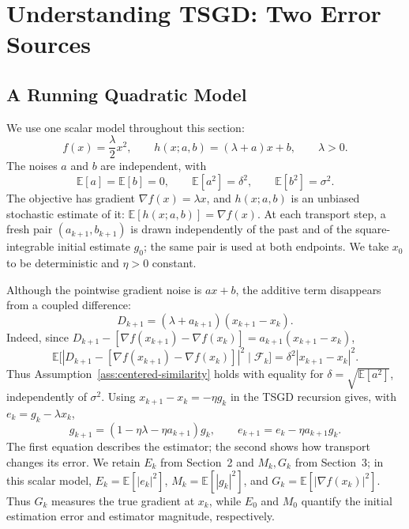 \section{Understanding TSGD: Two Error Sources}
\label{sec:two-error-sources}

\subsection{A Running Quadratic Model}
\label{subsec:quadratic-model}

We use one scalar model throughout this section:
\begin{equation}
\label{eq:quadratic-noise-model}
f(x)=\frac{\lambda}{2}x^2,\qquad
h(x;a,b)=(\lambda+a)x+b,
\qquad \lambda>0.
\end{equation}
The noises $a$ and $b$ are independent, with
\[
\mathbb{E}[a]=\mathbb{E}[b]=0,\qquad
\mathbb{E}[a^2]=\delta^2,\qquad
\mathbb{E}[b^2]=\sigma^2.
\]
The objective has gradient $\nabla f(x)=\lambda x$, and
$h(x;a,b)$ is an unbiased stochastic estimate of it:
$\mathbb{E}[h(x;a,b)]=\nabla f(x)$.
At each transport step, a fresh pair $(a_{k+1},b_{k+1})$ is drawn
independently of the past and of the square-integrable initial estimate
$g_0$; the same pair is used at both endpoints. We take $x_0$ to be
deterministic and $\eta>0$ constant.

Although the pointwise gradient noise is $ax+b$, the additive term
disappears from a coupled difference:
\begin{equation}
\label{eq:quadratic-coupled-difference}
D_{k+1}=(\lambda+a_{k+1})(x_{k+1}-x_k).
\end{equation}
Indeed, since
$D_{k+1}-[\nabla f(x_{k+1})-\nabla f(x_k)]
=a_{k+1}(x_{k+1}-x_k)$,
\[
\mathbb{E}\bigl[|D_{k+1}-[\nabla f(x_{k+1})-
\nabla f(x_k)]|^2\mid\mathcal F_k\bigr]
=\delta^2|x_{k+1}-x_k|^2.
\]
Thus Assumption~\ref{ass:centered-similarity} holds with equality
for $\delta=\sqrt{\mathbb{E}[a^2]}$, independently of $\sigma^2$.
Using $x_{k+1}-x_k=-\eta g_k$ in the TSGD recursion gives,
with $e_k=g_k-\lambda x_k$,
\begin{equation}
\label{eq:quadratic-core-recursions}
g_{k+1}=(1-\eta\lambda-\eta a_{k+1})g_k,
\qquad
e_{k+1}=e_k-\eta a_{k+1}g_k.
\end{equation}
The first equation describes the estimator; the second shows how
transport changes its error. We retain $E_k$ from Section~2 and
$M_k,G_k$ from Section~3; in this scalar model,
$E_k=\mathbb{E}[|e_k|^2]$, $M_k=\mathbb{E}[|g_k|^2]$, and
$G_k=\mathbb{E}[|\nabla f(x_k)|^2]$. Thus $G_k$ measures the true
gradient at $x_k$, while $E_0$ and $M_0$ quantify the initial
estimation error and estimator magnitude, respectively.

